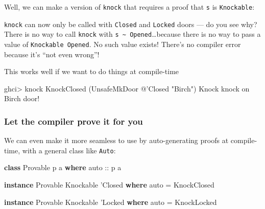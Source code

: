 \documentclass[]{article}
\newenvironment{Shaded}{}{}
\newcommand{\DataTypeTok}[1]{\textcolor[rgb]{0.56,0.13,0.00}{#1}}
\newcommand{\FunctionTok}[1]{\textcolor[rgb]{0.02,0.16,0.49}{#1}}
\newcommand{\KeywordTok}[1]{\textcolor[rgb]{0.00,0.44,0.13}{\textbf{#1}}}
\newcommand{\NormalTok}[1]{#1}
\newcommand{\OtherTok}[1]{\textcolor[rgb]{0.00,0.44,0.13}{#1}}
\newcommand{\StringTok}[1]{\textcolor[rgb]{0.25,0.44,0.63}{#1}}
\begin{document}
Well, we can make a version of \texttt{knock} that requires a proof that
\texttt{s} is \texttt{Knockable}:

\begin{Shaded}
\end{Shaded}

\texttt{knock} can now only be called with \texttt{Closed} and \texttt{Locked}
doors --- do you see why? There is no way to call \texttt{knock} with
\texttt{s\ \textasciitilde{}\ \textquotesingle{}Opened}\ldots{}because there is
no way to pass a value of \texttt{Knockable\ \textquotesingle{}Opened}. No such
value exists! There's no compiler error because it's ``not even wrong''!

This works well if we want to do things at compile-time

\begin{Shaded}
\begin{Highlighting}[]
\NormalTok{ghci}\FunctionTok{>}\NormalTok{ knock }\DataTypeTok{KnockClosed}\NormalTok{ (}\DataTypeTok{UnsafeMkDoor} \FunctionTok{@}\NormalTok{'}\DataTypeTok{Closed} \StringTok{"Birch"}\NormalTok{)}
\DataTypeTok{Knock}\NormalTok{ knock on }\DataTypeTok{Birch}\NormalTok{ door}\FunctionTok{!}
\end{Highlighting}
\end{Shaded}

\hypertarget{let-the-compiler-prove-it-for-you}{%
\subsubsection{Let the compiler prove it for
you}\label{let-the-compiler-prove-it-for-you}}

We can even make it more seamless to use by auto-generating proofs at
compile-time, with a general class like \texttt{Auto}:

\begin{Shaded}
\begin{Highlighting}[]
\KeywordTok{class} \DataTypeTok{Provable}\NormalTok{ p a }\KeywordTok{where}
\OtherTok{    auto ::}\NormalTok{ p a}

\KeywordTok{instance} \DataTypeTok{Provable} \DataTypeTok{Knockable}\NormalTok{ '}\DataTypeTok{Closed} \KeywordTok{where}
\NormalTok{    auto }\FunctionTok{=} \DataTypeTok{KnockClosed}

\KeywordTok{instance} \DataTypeTok{Provable} \DataTypeTok{Knockable}\NormalTok{ '}\DataTypeTok{Locked} \KeywordTok{where}
\NormalTok{    auto }\FunctionTok{=} \DataTypeTok{KnockLocked}
\end{Highlighting}
\end{Shaded}
\end{document}
